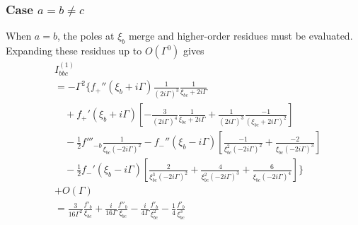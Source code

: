 \documentclass[twocolumn,superscriptaddress]{revtex4-1}
\begin{document}
\subsubsection{Case $a=b\neq c$}
When $a=b$, the poles at $\xi_b$ merge and higher-order residues must be evaluated.
Expanding these residues up to $O(\Gamma^0)$ gives
\begin{align}
&I_{bbc}^{(1)}\nonumber \\
&=
-\Gamma^2\Biggl\{
f_+''(\xi_b+i\Gamma)\frac{1}{(2i\Gamma)^3}\frac{1}{\xi_{bc}+2i\Gamma} \nonumber \\
&\quad+f_+'(\xi_b+i\Gamma)\left[
-\frac{3}{(2i\Gamma)^4}\frac{1}{\xi_{bc}+2i\Gamma}
+\frac{1}{(2i\Gamma)^3}\frac{-1}{(\xi_{bc}+2i\Gamma)^2}
\right]\nonumber \\
&\quad
-\frac{1}{2}f'''_{-b}\frac{1}{\xi_{bc}(-2i\Gamma)^2}
-f_-''(\xi_b-i\Gamma)\left[
\frac{-1}{\xi_{bc}^2(-2i\Gamma)^2}
+\frac{-2}{\xi_{bc}(-2i\Gamma)^3}
\right] \nonumber \\
&\quad
-\frac{1}{2}f_-'(\xi_b-i\Gamma)\left[
\frac{2}{\xi_{bc}^3(-2i\Gamma)^2}
+\frac{4}{\xi_{bc}^2(-2i\Gamma)^3}
+\frac{6}{\xi_{bc}(-2i\Gamma)^4}
\right]
\Biggr\} \nonumber \\
&+O(\Gamma) \nonumber \\
&=
\frac{3}{16\Gamma^2}\frac{f'_b}{\xi_{bc}}
+\frac{i}{16\Gamma}\frac{f''_b}{\xi_{bc}}
-\frac{i}{4\Gamma}\frac{f'_b}{\xi_{bc}^2}
-\frac{1}{4}\frac{f'_b}{\xi_{bc}^3}

\end{align}
\end{document}
